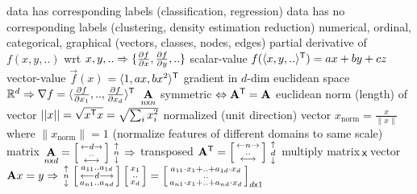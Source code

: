 \documentclass[10pt]{article}
\begin{document}
 \noindent \scriptsize \setlength{\fboxsep}{0pt}
 \quad
{} \quad
{} data has corresponding labels (classification, regression)
 data has no corresponding labels (clustering, density estimation reduction)
 numerical, ordinal, categorical, graphical (vectors, classes, nodes, edges)
\NEW    partial derivative of $f(x,y,..)$ wrt $x,y,.. \Rightarrow \{\frac{\partial f}{\partial x}, \frac{\partial f}{\partial y},..\}$
\NEW    scalar-value $f(\langle x,y,..\rangle^{\mathsf{T}}) = ax+by+cz$
\NEW    vector-value $\vec{f}(x)$ $=\langle 1, ax,bx^2 \rangle^{\mathsf{T}}$
\NEW    gradient in $d$-dim euclidean space $\mathbb{R}^d \Rightarrow \nabla f = \langle\frac{\partial f}{\partial x_1},..,\frac{\partial f}{\partial x_d} \rangle^{\mathsf{T}}$
\NEW    $\underset{n\mathsf{x} n}{{\mathbf{A}}}$ symmetric $\Leftrightarrow {\mathbf{A}}^{\mathsf{T}} = {\mathbf{A}}$
\NEW    euclidean norm (length) of vector $||x||= \sqrt{x^{\mathsf{T}} x} = \sqrt{\sum_i x_i^2}$
\NEW    normalized (unit direction) vector $x_{\text{norm}} = \frac{x}{\|x\|}$ where $\|x_{\text{norm}}\| = 1$ (normalize features of different domains to same scale)
\NEW    matrix $\underset{n\mathsf{x} d}{{\mathbf{A}}} = \left[\begin{smallmatrix}\leftarrow d \rightarrow \\..\\ \longleftrightarrow\end{smallmatrix}\right] \begin{smallmatrix}\uparrow \\n\\ \downarrow \end{smallmatrix} \Rightarrow$ transposed ${\mathbf{A}}^{\mathsf{T}} = \left[\begin{smallmatrix}\leftarrow n \rightarrow \\..\\ \longleftrightarrow\end{smallmatrix}\right] \begin{smallmatrix}\uparrow \\d\\ \downarrow \end{smallmatrix}$
\NEW    multiply matrix$\,\mathsf{x}\,$vector ${\mathbf{A}}x = y \Rightarrow \begin{smallmatrix}\uparrow \\n\\ \downarrow \end{smallmatrix} \left[\begin{smallmatrix} a_{11} .. a_{1d}\\ \longleftarrow d \longrightarrow \\a_{n1} .. a_{nd} \end{smallmatrix}\right] \left[\begin{smallmatrix} x_1 \\..\\ x_d \end{smallmatrix}\right] = \left[\begin{smallmatrix} a_{11} \cdot x_1 + .. + a_{1d} \cdot x_d \\..\\ a_{n1} \cdot x_1 + .. + a_{nd} \cdot x_d \end{smallmatrix}\right]_{d \mathsf{x} 1}$
\end{document}
